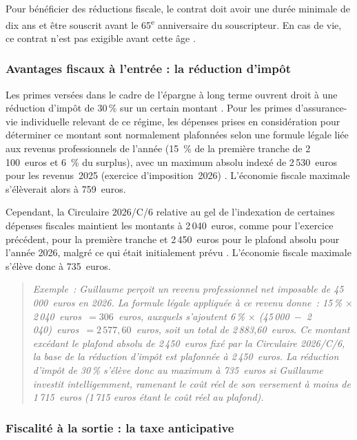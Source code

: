 ﻿\documentclass[12pt, a4paper]{article}
\begin{document}
Pour bénéficier des réductions fiscale, 
le contrat doit avoir une durée minimale de dix ans et être
souscrit avant le 65\textsuperscript{e} anniversaire du
souscripteur. En cas de vie, ce contrat n'est pas exigible avant cette âge \cite[art.~145\textsuperscript{4}]{cir92_2025}. 

\subsubsection*{Avantages fiscaux à l'entrée : la réduction
d'impôt}
\label{sub:avantages_elt}

Les primes versées dans le cadre de l'épargne à long terme
ouvrent droit à une réduction d'impôt de 30\,\% sur un certain montant \cite[art.~145\textsuperscript{2}]{cir92_2025}.
Pour les primes d'assurance-vie individuelle relevant de ce régime, 
les dépenses prises en considération pour déterminer ce montant sont normalement plafonnées 
selon une formule légale liée aux revenus professionnels de l'année (15\, \% de la première 
tranche de 2\,100~euros et 6\, \% du surplus), avec un maximum absolu indexé de 
2\,530~euros pour les revenus~2025 (exercice d'imposition~2026) \cite[art.~145\textsuperscript{6}]{cir92_2025}.
L'économie fiscale maximale s'élèverait alors à 759~euros.

Cependant, la Circulaire 2026/C/6 relative au gel de l'indexation de certaines 
dépenses fiscales maintient les montants à 2\,040~euros, comme pour l'exercice précédent, pour la première tranche 
et 2\,450~euros pour le plafond absolu pour l'année 2026, malgré ce qui était initialement 
prévu \cite{cir92_circ2026}.
L'économie fiscale maximale s'élève donc à 735~euros. 

\begin{quote}
\textit{Exemple~: Guillaume perçoit un revenu professionnel net imposable de 45\,000~euros en 2026.
La formule légale appliquée à ce revenu donne~: 15\,\% $\times$ 2\,040~euros~$= 306$~euros, 
auxquels s'ajoutent 6\,\% $\times$ (45\,000~$-$~2\,040)~euros~$= 2\,577{,}60$~euros,
soit un total de 2\,883{,}60~euros.
Ce montant excédant le plafond absolu de 2\,450~euros fixé par la Circulaire 2026/C/6,
la base de la réduction d'impôt est plafonnée à 2\,450~euros.
La réduction d'impôt de 30\,\% s'élève donc au maximum à 735~euros si Guillaume investit intelligemment,
ramenant le coût réel de son versement à moins de 1\,715~euros (1\,715 euros étant le coût réel au plafond).}
\end{quote}

\subsubsection*{Fiscalité à la sortie : la taxe anticipative}
\label{subsub:taxe_anticipative_elt}
\end{document}
